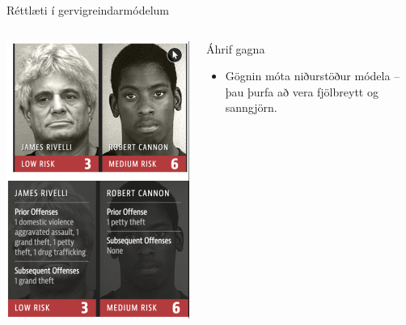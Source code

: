 \documentclass[
    NAME={Dr. Helga Ingimundardóttir},
    EMAIL={helgaingim@hi.is},
    FACULTY={Iðnaðarverkfræðideild},
    TITLE={Spáum fyrir um framtíð gervigreindar},
    SUBTITLE={út frá akademísku sjónarmiði},
    SEMINAR={Stjórnvísi},
    DATE={22. febrúar 2025},
    WIDE=true,
    ICELANDIC=true
]{HI-LaTeX/hi-beamer}
\begin{document}
\begin{frame}{Réttlæti í gervigreindarmódelum}
\begin{columns}
    \begin{column}{.25\linewidth}
        \centering
        \includegraphics[width=\linewidth]{myndir/ai-bias.png}
    \end{column}
    \begin{column}{0.6\linewidth}
    \begin{block}{Áhrif gagna}
        \begin{itemize}
            \item Gögnin móta niðurstöður módela – þau þurfa að vera fjölbreytt og sanngjörn.
        \end{itemize}
    \end{block}

\end{column}
\end{columns}
\end{frame}
\end{document}
